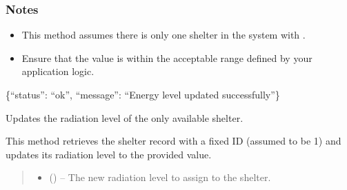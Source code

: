 \documentclass[letterpaper,10pt,english]{sphinxmanual}
\begin{document}
\begin{fulllineitems}
\begin{fulllineitems}
\begin{quote}
\begin{description}
\begin{itemize}
\end{itemize}

\end{description}\end{quote}
\subsubsection*{Notes}
\begin{itemize}
\item {} 
\sphinxAtStartPar
This method assumes there is only one shelter in the system with .

\item {} 
\sphinxAtStartPar
Ensure that the  value is within the acceptable range defined by your application logic.

\end{itemize}
\begin{description}
\sphinxAtStartPar
\{“status”: “ok”, “message”: “Energy level updated successfully”\}

\end{description}

\end{fulllineitems}


\begin{fulllineitems}
\label{\detokenize{app.controllers:app.controllers.shelter_controller.ShelterController.updateShelterRadiationLevel}}
\pysigstartsignatures
\pysiglinewithargsret
{}
{\sphinxparamcomma {}}
{}
\pysigstopsignatures
\sphinxAtStartPar
Updates the radiation level of the only available shelter.

\sphinxAtStartPar
This method retrieves the shelter record with a fixed ID (assumed to be 1) and updates
its radiation level to the provided value.
\begin{quote}\begin{description}
\begin{itemize}
\item {} 
\sphinxAtStartPar
{} () – The new radiation level to assign to the shelter.


\end{itemize}
\end{description}
\end{quote}
\end{fulllineitems}
\end{fulllineitems}
\end{document}
